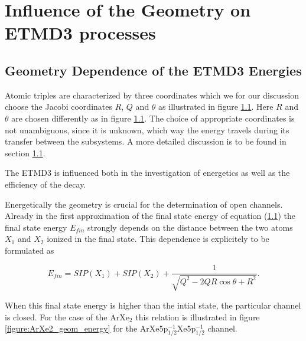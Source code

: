 \section{Influence of the Geometry on ETMD3 processes}
\subsection{Geometry Dependence of the ETMD3 Energies}
Atomic triples are characterized by three coordinates which we for
our discussion choose the Jacobi coordinates $R$, $Q$ and $\theta$ as illustrated
in figure \ref{}. Here $R$ and $\theta$ are chosen differently as in
figure \ref{}. The choice of appropriate coordinates is not unambiguous,
since it is unknown, which way the energy travels during its transfer
between the subsystems. A more detailed discussion is to be found in 
section \ref{}.

The \ac{ETMD}3 is influenced both in the investigation of energetics
as well as the efficiency of the decay.

Energetically the geometry is crucial for the determination of open channels.
Already in the first approximation of the final state energy of equation (\ref{})
the final state energy $E_{fin}$ strongly depends on the distance between the
two atoms $X_1$ and $X_2$ ionized in the final state. This dependence is explicitely to be
formulated as

\begin{equation}
  E_{fin} = SIP(X_1) + SIP(X_2) + \frac{1}{\sqrt{Q^2 - 2QR\cos\theta + R^2}} .
\end{equation}

When this final state energy is higher than the intial state, the particular
channel is closed. For the case of the ArXe$_2$ this relation is illustrated
in figure \ref{figure:ArXe2_geom_energy} for the
ArXe5p$_{1/2}^{-1}$Xe5p$_{1/2}^{-1}$ channel.

